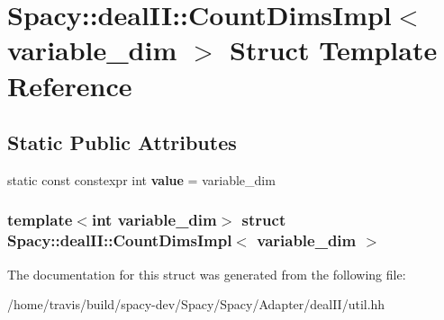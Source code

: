 \hypertarget{structSpacy_1_1dealII_1_1CountDimsImpl_3_01variable__dim_01_4}{\section{\-Spacy\-:\-:deal\-I\-I\-:\-:\-Count\-Dims\-Impl$<$ variable\-\_\-dim $>$ \-Struct \-Template \-Reference}
\label{structSpacy_1_1dealII_1_1CountDimsImpl_3_01variable__dim_01_4}
}
\subsection*{\-Static \-Public \-Attributes}
\begin{DoxyCompactItemize}
\item 
\hypertarget{structSpacy_1_1dealII_1_1CountDimsImpl_3_01variable__dim_01_4_a0e95579aedd3a6000691f71972dfdcb4}{static const constexpr int {\bfseries value} = variable\-\_\-dim}\label{structSpacy_1_1dealII_1_1CountDimsImpl_3_01variable__dim_01_4_a0e95579aedd3a6000691f71972dfdcb4}

\end{DoxyCompactItemize}
\subsubsection*{template$<$int variable\-\_\-dim$>$ struct Spacy\-::deal\-I\-I\-::\-Count\-Dims\-Impl$<$ variable\-\_\-dim $>$}



\-The documentation for this struct was generated from the following file\-:\begin{DoxyCompactItemize}
\item 
/home/travis/build/spacy-\/dev/\-Spacy/\-Spacy/\-Adapter/deal\-I\-I/util.\-hh\end{DoxyCompactItemize}
